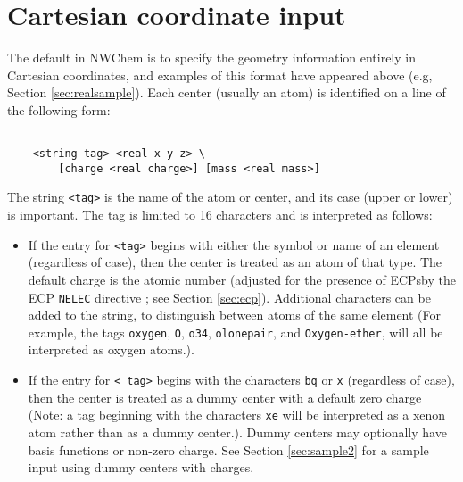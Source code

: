 \section{Cartesian coordinate input}
\label{sec:cart}

The default in NWChem is to specify the geometry information entirely
in Cartesian coordinates, and examples of this format have 
appeared above (e.g, Section \ref{sec:realsample}). Each center
(usually an atom) is identified on a line of the following form:
\begin{verbatim}

    <string tag> <real x y z> \
        [charge <real charge>] [mass <real mass>]

\end{verbatim}

The string \verb+<tag>+ is the name of the atom or center, and its case
(upper or lower) is important.  The tag is limited to 16 characters
and is interpreted as follows:
\begin{itemize}
\item If the entry for \verb+<tag>+ begins with either the symbol or
  name of an element (regardless of case), then the center is treated
  as an atom of that type.  The default charge is the atomic number
  (adjusted for the presence of ECPsby the ECP \verb+NELEC+ directive
  ; see Section \ref{sec:ecp}).  Additional characters can be added to
  the string, to distinguish between atoms of the same element (For
  example, the tags \verb+oxygen+, \verb+O+, \verb+o34+,
  \verb+olonepair+, and \verb+Oxygen-ether+, will all be interpreted
  as oxygen atoms.).
\item If the entry for \verb+< tag>+ begins with the characters
  \verb+bq+ or \verb+x+ (regardless of case), then the center is
  treated as a dummy center with a default zero charge (Note: a tag
  beginning with the characters \verb+xe+ will be interpreted as a
  xenon atom rather than as a dummy center.).  Dummy centers may
  optionally have basis functions or non-zero charge.  See Section
  \ref{sec:sample2} for a sample input using dummy centers with
  charges.
\end{itemize}

